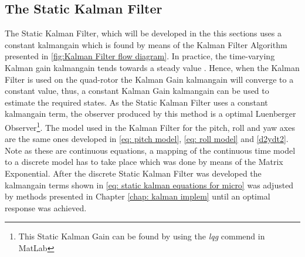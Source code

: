 \subsection{The Static Kalman Filter}
The Static Kalman Filter, which will be developed in the this sections uses a constant \gls{kalmangain} which is found by means of the Kalman Filter Algorithm presented in \ref{fig:Kalman Filter flow diagram}. In practice, the time-varying Kalman gain \gls{kalmangain} tends towards a steady value \cite{LQG_mit}. Hence, when the Kalman Filter is used on the quad-rotor the Kalman Gain \gls{kalmangain} will converge to a constant value, thus, a constant Kalman Gain \gls{kalmangain} can be used to estimate the required states. As the Static Kalman Filter uses a constant \gls{kalmangain} term, the observer produced by this method is a optimal Luenberger Observer\footnote{This Static Kalman Gain can be found by using the \textit{lqg} commend in MatLab}. The model used in the Kalman Filter for the pitch, roll and yaw axes are the same ones developed in \eqref{eq: pitch model}, \eqref{eq: roll model} and \eqref{d2ydt2}. Note as these are continuous equations, a mapping of the continuous time model to a discrete model has to take place which was done by means of the Matrix Exponential. After the discrete Static Kalman Filter was developed the \gls{kalmangain} terms shown in \eqref{eq: static kalman equations for micro} was adjusted by methods presented in Chapter \ref{chap: kalman implem} until an optimal response was achieved. 
